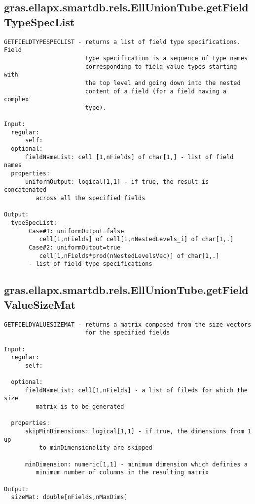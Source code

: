 \subsection{\texorpdfstring{gras.ellapx.smartdb.rels.EllUnionTube.getFieldTypeSpecList}{getFieldTypeSpecList}}\label{method:gras.ellapx.smartdb.rels.EllUnionTube.getFieldTypeSpecList}
\begin{verbatim}
GETFIELDTYPESPECLIST - returns a list of field type specifications. Field
                       type specification is a sequence of type names
                       corresponding to field value types starting with
                       the top level and going down into the nested
                       content of a field (for a field having a complex
                       type).

Input:
  regular:
      self:
  optional:
      fieldNameList: cell [1,nFields] of char[1,] - list of field names
  properties:
      uniformOutput: logical[1,1] - if true, the result is concatenated
         across all the specified fields

Output:
  typeSpecList:
       Case#1: uniformOutput=false
          cell[1,nFields] of cell[1,nNestedLevels_i] of char[1,.]
       Case#2: uniformOutput=true
          cell[1,nFields*prod(nNestedLevelsVec)] of char[1,.]
       - list of field type specifications
\end{verbatim}
\subsection{\texorpdfstring{gras.ellapx.smartdb.rels.EllUnionTube.getFieldValueSizeMat}{getFieldValueSizeMat}}\label{method:gras.ellapx.smartdb.rels.EllUnionTube.getFieldValueSizeMat}
\begin{verbatim}
GETFIELDVALUESIZEMAT - returns a matrix composed from the size vectors
                       for the specified fields

Input:
  regular:
      self:

  optional:
      fieldNameList: cell[1,nFields] - a list of fileds for which the size
         matrix is to be generated

  properties:
      skipMinDimensions: logical[1,1] - if true, the dimensions from 1 up
          to minDimensionality are skipped

      minDimension: numeric[1,1] - minimum dimension which definies a
         minimum number of columns in the resulting matrix

Output:
  sizeMat: double[nFields,nMaxDims]
\end{verbatim}
